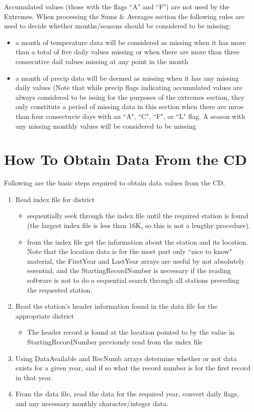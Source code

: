 \documentclass[12pt]{article}
\begin{document}
Accumulated values (those with the flags ``A" and ``F") are not used by the Extremes. When processing the Sums \& Averages section the following rules are used to decide whether months/seasons should be considered to be missing:
\begin{itemize}
\item a month of temperature data will be considered as missing when it has more than a total of five daily values missing or when there are more than three consecutive dail values missing at any point in the month
\item a month of precip data will be deemed as missing when it has any missing daily values (Note that while precip flags indicating accumulated values are always considered to be issing for the purposes of the extremes section, they only constitute a period of missing data in this section when there are mroe than four consectuvie days with an ``A", ``C", ``F", or ``L" flag. A season with any missing monthly values will be considered to be missing
\end{itemize}

\section{How To Obtain Data From the CD}
Following are the basic steps required to obtain data values from the CD.
\begin{enumerate}
\item Read index file for district
\begin{itemize}
\item sequentially seek through the index file until the required station is found (the largest index file is less than 16K, so this is not a lengthy procedure).
\item from the index file get the information about the station and its location.  Note that the location data is for the most part only ``nice to know" material, the FirstYear and LastYear arrays are useful by not absolutely essential, and the StartingRecordNumber is necessary if the reading software is not to do a sequential search through all stations preceding the requested station.
\end{itemize}
\item Read the station's header information found in the data file for the appropriate district
\begin{itemize}
\item The header record is found at the location pointed to by the value in StartingRecordNumber previously read from the index file
\end{itemize}
\item Using DataAvailable and RecNumb arrays determine whether or not data exists for a given year, and if so what the record number is for the first record in that year.
\item From the data file, read the data for the required year, convert daily flags, and any necessary monthly character/integer data.
\end{enumerate}
\end{document}
